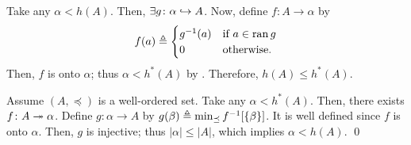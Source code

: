 \documentclass[../introduction_to_set_theory_Note.tex]{subfiles}
\begin{document}
{\begin{enumerate}[nolistsep, label=(\roman*), leftmargin=*, listparindent=\parindent]
    \ii
    Take any \(\alpha < h(A)\).
    Then, \(\exists g \colon \alpha \hookrightarrow A\).
    Now, define \(f \colon A \to \alpha\) by
    \[
        f(a) \triangleq \begin{cases}
            g^{-1}(a) & \text{if}~a \in \operatorname{ran} g \\
            0 & \text{otherwise.}
        \end{cases}
    \]
    Then, \(f\) is onto \(\alpha\); thus \(\alpha < h^\ast(A)\) by .
    Therefore, \(h(A) \le h^\ast(A)\).

    \ii
    Assume \((A, \preceq)\) is a well-ordered set.
    Take any \(\alpha < h^\ast(A)\).
    Then, there exists \(f \colon A \twoheadrightarrow \alpha\).
    Define \(g \colon \alpha \to A\) by
    \(g(\beta) \triangleq \min_{\preceq} f^{-1}[\{\beta\}]\).
    It is well defined since \(f\) is onto \(\alpha\).
    Then, \(g\) is injective; thus \(|\alpha| \le |A|\),
    which implies \(\alpha < h(A)\). \qed
\end{enumerate}
}
\end{document}
